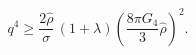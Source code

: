 \begin{equation}q^4\geq \frac{2\hat{\rho}}{\sigma}\,(1+\lambda)
\left(\frac{8\pi G_4}{3}\hat{\rho}\right)^2.\end{equation}

